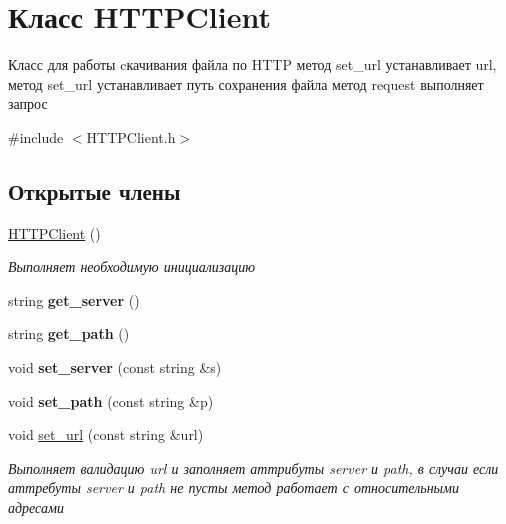\hypertarget{classHTTPClient}{}\section{Класс H\+T\+T\+P\+Client}
\label{classHTTPClient}


Класс для работы cкачивания файла по H\+T\+TP метод set\+\_\+url устанавливает url, метод set\+\_\+url устанавливает путь сохранения файла метод request выполняет запрос  




{\ttfamily \#include $<$H\+T\+T\+P\+Client.\+h$>$}

\subsection*{Открытые члены}
\begin{DoxyCompactItemize}
\item 
\mbox{\hyperlink{classHTTPClient_a23a15a8f27ac926a86c2ef7bc7bfebcb}{H\+T\+T\+P\+Client}} ()
\begin{DoxyCompactList}\small\item\em Выполняет необходимую инициализацию \end{DoxyCompactList}\item 
\mbox{\label{classHTTPClient_a22adef3fa98f8ccbfdaa01b680c89d9f}} 
string {\bfseries get\+\_\+server} ()
\item 
\mbox{\label{classHTTPClient_a44924003e10829e54f317e5f4c1ae896}} 
string {\bfseries get\+\_\+path} ()
\item 
\mbox{\label{classHTTPClient_a0811d512e091c1f00d237ae7cf82c566}} 
void {\bfseries set\+\_\+server} (const string \&s)
\item 
\mbox{\label{classHTTPClient_aa051b459d73f5e82b6884cc37d7f929b}} 
void {\bfseries set\+\_\+path} (const string \&p)
\item 
void \mbox{\hyperlink{classHTTPClient_ab5e2edcaacc8fe488fc84b8deea3fb61}{set\+\_\+url}} (const string \&url)
\begin{DoxyCompactList}\small\item\em Выполняет валидацию url и заполняет аттрибуты server и path, в случаи если аттребуты server и path не пусты метод работает с относительными адресами \end{DoxyCompactList}\item 

\end{DoxyCompactItemize}
